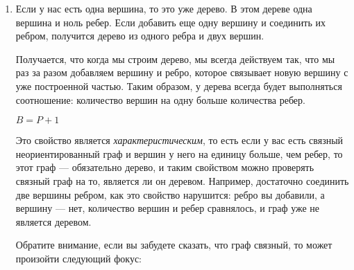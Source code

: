 \documentclass[russian]{lecture-notes}
\begin{document}
	\begin{enumerate}
		\item Если у нас есть одна вершина, то это уже дерево. В этом дереве одна вершина и ноль ребер. Если добавить еще одну вершину и соединить их ребром, получится дерево из одного ребра и двух вершин. 
		
		\begin{figure}[h]
			\centering
		\end{figure}
		
		Получается, что когда мы строим дерево, мы всегда действуем так, что мы раз за разом добавляем вершину и ребро, которое связывает новую вершину с уже построенной частью. Таким образом, у дерева всегда будет выполняться соотношение: количество вершин на одну больше количества ребер.
		
		\begin{center}
			\textbf{$B = P + 1$}
		\end{center}
		
		Это свойство является {\em характеристическим}, то есть если у вас есть связный неориентированный граф и вершин у него на единицу больше, чем ребер, то этот граф --- обязательно дерево, и таким свойством можно проверять связный граф на то, является ли он деревом. Например, достаточно соединить две вершины ребром, как это свойство нарушится: ребро вы добавили, а вершину --- нет, количество вершин и ребер сравнялось, и граф уже не является деревом. 
		
		Обратите внимание, если вы забудете сказать, что граф связный, то может произойти следующий фокус:   
		
		\begin{figure}[h]
			\centering
		\end{figure}
		

\end{enumerate}
\end{document}
